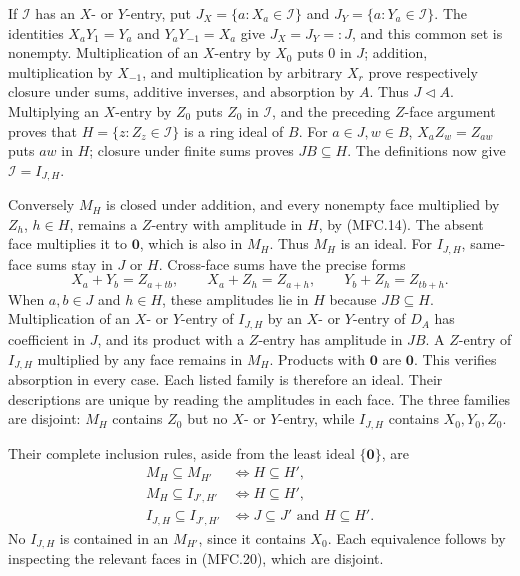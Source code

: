 If \(\mathcal I\) has an \(X\)- or \(Y\)-entry, put
\(J_X=\{a:X_a\in\mathcal I\}\) and \(J_Y=\{a:Y_a\in\mathcal I\}\).
The identities \(X_aY_1=Y_a\) and \(Y_aY_{-1}=X_a\)
give \(J_X=J_Y=:J\), and this common set is nonempty.
Multiplication of an \(X\)-entry by \(X_0\) puts \(0\) in \(J\);
addition, multiplication by \(X_{-1}\), and multiplication by
arbitrary \(X_r\) prove respectively closure under sums, additive
inverses, and absorption by \(A\). Thus \(J\triangleleft A\).
Multiplying an \(X\)-entry by \(Z_0\) puts \(Z_0\) in
\(\mathcal I\), and the preceding \(Z\)-face argument proves that
\(H=\{z:Z_z\in\mathcal I\}\) is a ring ideal of \(B\).
For \(a\in J,w\in B\), \(X_aZ_w=Z_{aw}\) puts \(aw\) in \(H\);
closure under finite sums proves \(JB\subseteq H\).
The definitions now give \(\mathcal I=I_{J,H}\).

Conversely \(M_H\) is closed under addition, and every nonempty face
multiplied by \(Z_h\), \(h\in H\), remains a \(Z\)-entry with
amplitude in \(H\), by (MFC.14). The absent face multiplies
it to \(\mathbf0\), which is also in \(M_H\). Thus \(M_H\) is an ideal.
For \(I_{J,H}\), same-face sums stay in \(J\) or \(H\).
Cross-face sums have the precise forms
\[
 X_a+Y_b=Z_{a+tb},\qquad X_a+Z_h=Z_{a+h},\qquad
 Y_b+Z_h=Z_{tb+h}.                                       \tag{MFC.22}
\]
When \(a,b\in J\) and \(h\in H\), these amplitudes lie in \(H\)
because \(JB\subseteq H\). Multiplication of an \(X\)- or
\(Y\)-entry of \(I_{J,H}\) by an \(X\)- or \(Y\)-entry of \(D_A\)
has coefficient in \(J\), and its product with a \(Z\)-entry
has amplitude in \(JB\). A \(Z\)-entry of \(I_{J,H}\) multiplied
by any face remains in \(M_H\). Products with \(\mathbf0\)
are \(\mathbf0\). This verifies absorption in every case.
Each listed family is therefore an ideal. Their descriptions
are unique by reading the amplitudes in each face. The three
families are disjoint: \(M_H\) contains \(Z_0\) but no \(X\)- or
\(Y\)-entry, while \(I_{J,H}\) contains \(X_0,Y_0,Z_0\).

Their complete inclusion rules, aside from the least ideal
\(\{\mathbf0\}\), are
\[
 \begin{aligned}
 M_H\subseteq M_{H'}&\iff H\subseteq H',\\
 M_H\subseteq I_{J',H'}&\iff H\subseteq H',\\
 I_{J,H}\subseteq I_{J',H'}&\iff J\subseteq J'
                                      \text{ and }H\subseteq H'.
 \end{aligned}                                           \tag{MFC.23}
\]
No \(I_{J,H}\) is contained in an \(M_{H'}\), since it contains
\(X_0\). Each equivalence follows by inspecting the relevant
faces in (MFC.20), which are disjoint.

